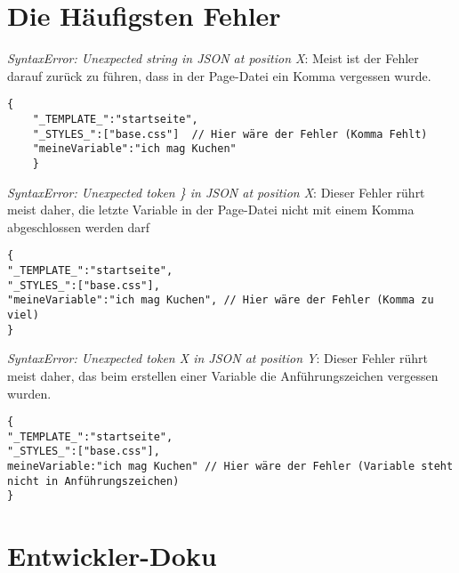 \documentclass[ngerman,a4paper]{scrartcl}
\begin{document}
\section{Die Häufigsten Fehler}
\textit{SyntaxError: Unexpected string in JSON at position X}: 
\newline
Meist ist der Fehler darauf zurück zu führen, dass in der Page-Datei 
ein Komma vergessen wurde.
\begin{lstlisting}[style=JSSTE]
	{
	"_TEMPLATE_":"startseite",
	"_STYLES_":["base.css"]  // Hier wäre der Fehler (Komma Fehlt)
	"meineVariable":"ich mag Kuchen"
	}
\end{lstlisting}

\textit{SyntaxError: Unexpected token \} in JSON at position X}: 
\newline
Dieser Fehler rührt meist daher, die letzte Variable in der Page-Datei nicht mit einem Komma abgeschlossen werden darf
\begin{lstlisting}[style=JSSTE]
{
"_TEMPLATE_":"startseite",
"_STYLES_":["base.css"],  
"meineVariable":"ich mag Kuchen", // Hier wäre der Fehler (Komma zu viel)
}
\end{lstlisting}

\textit{SyntaxError: Unexpected token X in JSON at position Y}: 
\newline
Dieser Fehler rührt meist daher, das beim erstellen einer Variable die Anführungszeichen vergessen wurden.
\begin{lstlisting}[style=JSSTE]
{
"_TEMPLATE_":"startseite",
"_STYLES_":["base.css"],  
meineVariable:"ich mag Kuchen" // Hier wäre der Fehler (Variable steht nicht in Anführungszeichen)
}
\end{lstlisting}

\section{Entwickler-Doku}
\end{document}
